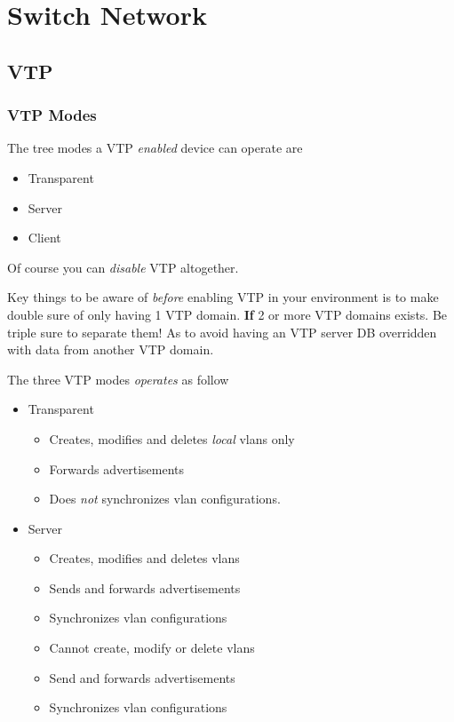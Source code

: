 \section{Switch Network}

\subsection{VTP}

\subsubsection{VTP Modes}
The tree modes a VTP \textit{enabled} device can operate are
\begin{itemize}
    \item Transparent
    \item Server
    \item Client
\end{itemize}
Of course you can \textit{disable} VTP altogether.

Key things to be aware of \textit{before} enabling VTP in your environment is to make double sure of only having 1 VTP domain. \textbf{If} 2 or more VTP domains exists. Be triple sure to separate them! As to avoid having an VTP server DB overridden with data from another VTP domain.

The three VTP modes \textit{operates} as follow
\begin{itemize}
    \item Transparent
    \begin{itemize}
        \item Creates, modifies and deletes \textit{local} vlans only
        \item Forwards advertisements
        \item Does \textit{not} synchronizes vlan configurations.
    \end{itemize}
    \item Server
    \begin{itemize}
        \item Creates, modifies and deletes vlans
        \item Sends and forwards advertisements
        \item Synchronizes vlan configurations
    \end{itemize}
    \begin{itemize}
        \item Cannot create, modify or delete vlans
        \item Send and forwards advertisements
        \item Synchronizes vlan configurations
    \end{itemize}
\end{itemize}

